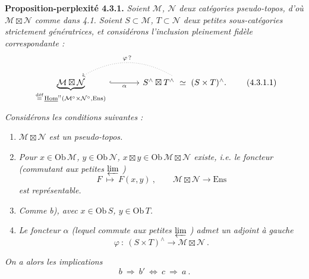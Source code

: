 \documentclass[11pt]{article}
\newcommand{\cM}{\mathcal{M}}
\newcommand{\cN}{\mathcal{N}}
\newcommand{\uHom}{\underline{\mathrm{Hom}}}
\newcommand{\Ens}{\mathrm{Ens}}
\newcommand{\Ob}{\mathrm{Ob}\,}
\newcommand{\defeq}{\overset{\text{déf}}{=}}
\newcommand{\bt}{\boxtimes}
\begin{document}
\textbf{Proposition-perplexité 4.3.1.} \textit{Soient $\cM$, $\cN$ deux catégories pseudo-topos, d'où $\cM\bt\cN$ comme dans 4.1. Soient $S\subset\cM$, $T\subset\cN$ deux petites sous-catégories strictement génératrices, et considérons l'inclusion pleinement fidèle correspondante :}
\[
\begin{tikzcd}[column sep=large]
\underbrace{\cM\bt\cN}_{\defeq\, \uHom^{!!}(\cM^{\circ}\times\cN^{\circ},\Ens)} \arrow[r, hook, "\alpha"'] & S^{\wedge}\bt T^{\wedge} \ \simeq\ (S\times T)^{\wedge}. \arrow[l, dotted, bend right, "\varphi\,?"']
\end{tikzcd}
\tag*{(4.3.1.1)}
\]
\textit{Considérons les conditions suivantes :}
\begin{enumerate}[label={}]
\item[\textit{a)}] \textit{$\cM\bt\cN$ est un pseudo-topos.}
\item[\textit{b)}] \textit{Pour $x\in\Ob\cM$, $y\in\Ob\cN$, $x\bt y\in\Ob\cM\bt\cN$ existe, i.e. le foncteur (commutant aux petites $\varprojlim$ )}
\[
F \ \longmapsto\ F(x,y) \ , \qquad \cM\bt\cN \longrightarrow \Ens
\tag*{(4.3.1.2)}
\]
\textit{est représentable.}
\item[\textit{b$'$)}] \textit{Comme b), avec $x\in\Ob S$, $y\in\Ob T$.}
\item[\textit{c)}] \textit{Le foncteur $\alpha$ (lequel commute aux petites $\varprojlim$ ) admet un adjoint à gauche}
\[
\varphi \ :\ (S\times T)^{\wedge} \longrightarrow \cM\bt\cN \ .
\]
\end{enumerate}
\textit{On a alors les implications}
\[
b \ \Longrightarrow\ b' \ \Longleftrightarrow\ c \ \Longrightarrow\ a \ .
\tag*{(4.3.1.3)}
\]
\end{document}
